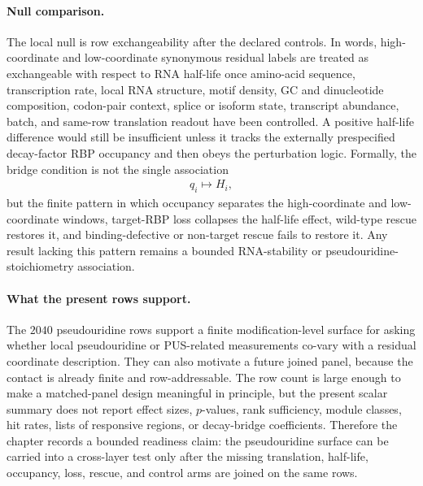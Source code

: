 \paragraph{Null comparison.}
The local null is row exchangeability after the declared controls.  In words, high-coordinate and low-coordinate synonymous residual labels are treated as exchangeable with respect to RNA half-life once amino-acid sequence, transcription rate, local RNA structure, motif density, GC and dinucleotide composition, codon-pair context, splice or isoform state, transcript abundance, batch, and same-row translation readout have been controlled.  A positive half-life difference would still be insufficient unless it tracks the externally prespecified decay-factor RBP occupancy and then obeys the perturbation logic.  Formally, the bridge condition is not the single association
$$
\begin{aligned}
q_i \longmapsto H_i,
\end{aligned}
$$
but the finite pattern in which occupancy separates the high-coordinate and low-coordinate windows, target-RBP loss collapses the half-life effect, wild-type rescue restores it, and binding-defective or non-target rescue fails to restore it.  Any result lacking this pattern remains a bounded RNA-stability or pseudouridine-stoichiometry association.

\paragraph{What the present rows support.}
The $2040$ pseudouridine rows support a finite modification-level surface for asking whether local pseudouridine or PUS-related measurements co-vary with a residual coordinate description.  They can also motivate a future joined panel, because the contact is already finite and row-addressable.  The row count is large enough to make a matched-panel design meaningful in principle, but the present scalar summary does not report effect sizes, $p$-values, rank sufficiency, module classes, hit rates, lists of responsive regions, or decay-bridge coefficients.  Therefore the chapter records a bounded readiness claim: the pseudouridine surface can be carried into a cross-layer test only after the missing translation, half-life, occupancy, loss, rescue, and control arms are joined on the same rows.

